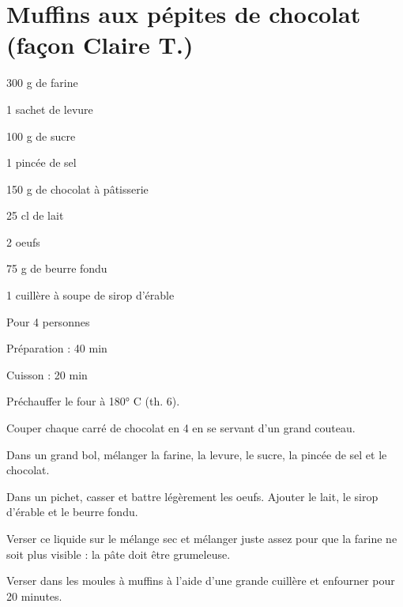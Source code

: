 \section[\normalsize{Muffins aux pépites de chocolat (façon Claire T.)}]{Muffins aux pépites de chocolat (façon Claire T.)}

\begin{ingredients}
\item 300 g de farine
\item 1 sachet de levure
\item 100 g de sucre
\item 1 pinc\'ee de sel
\item 150 g de chocolat \`a p\^atisserie
\item 25 cl de lait
\item 2 oeufs
\item 75 g de beurre fondu
\item 1 cuill\`ere \`a soupe de sirop d'\'erable
\end{ingredients}
\begin{infos}
\item Pour 4 personnes
\item Préparation : 40 min
\item Cuisson : 20 min
\end{infos}
\begin{etapes}
\item Pr\'echauffer le four \`a 180° C (th. 6).
\item Couper chaque carr\'e de chocolat en 4 en se servant d'un grand couteau.
\item Dans un grand bol, m\'elanger la farine, la levure, le sucre, la pinc\'ee de sel et le chocolat.
\item Dans un pichet, casser et battre l\'eg\`erement les oeufs. Ajouter le lait, le sirop d'\'erable et le beurre fondu.
\item Verser ce liquide sur le m\'elange sec et m\'elanger juste assez pour que la farine ne soit plus visible : la p\^ate doit \^etre grumeleuse.
\item Verser dans les moules \`a muffins \`a l'aide d'une grande cuill\`ere et enfourner pour 20 minutes.
\end{etapes}
\begin{conseils}
\end{conseils}
